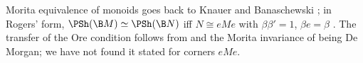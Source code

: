 \status{} Morita equivalence of monoids goes back to Knauer and Banaschewski \cite{knauer,banaschewski}; in Rogers' form, $\PSh(\B M)\simeq\PSh(\B N)$ iff $N\cong eMe$ with $\beta\beta' = 1$, $\beta e = \beta$ \cite[Cor.~6.6]{rogers-1905}. The transfer of the Ore condition follows from \cite[Thm~2.31]{hemelaer-rogers} and the Morita invariance of being De Morgan; we have not found it stated for corners $eMe$.
